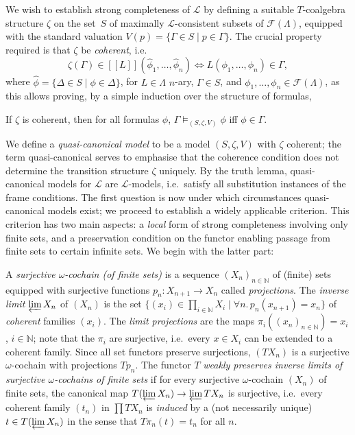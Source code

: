 \documentclass[proceedings]{stacs}
\theoremstyle{definition}
\theoremstyle{plain}
\newcommand{\Sem}[1]{{[\![#1]\!]}}
\newcommand{\Lang}{\mathcal{L}}
\newcommand{\FLang}{\mathcal{F}}
\newcommand{\Nat}{{\mathbb{N}}}
\newcommand{\invlim}{\varprojlim}
\begin{document}
\noindent 
We wish to establish strong completeness of $\Lang$ by defining a
suitable $T$-coalgebra structure $\zeta$ on the set~$S$ of maximally
$\Lang$-consistent subsets of $\FLang(\Lambda)$, equipped with the
standard valuation $V(p)=\{\Gamma\in S\mid p\in\Gamma\}$. The crucial
property required is that $\zeta$ be \emph{coherent}, i.e.
\begin{equation*}
  \zeta(\Gamma)\in \Sem{L}(\hat\phi_1,\dots,\hat\phi_n) \iff 
  L(\phi_1,\dots,\phi_n)\in \Gamma,
\end{equation*}
where $\hat\phi=\{\Delta\in S\mid \phi\in\Delta\}$, for $L\in\Lambda$
$n$-ary, $\Gamma\in S$, and $\phi_1,\dots,\phi_n\in\FLang(\Lambda)$,
as this allows proving, by a simple induction over the structure of
formulas,
\begin{lem}
  If $\zeta$ is coherent, then for all formulas $\phi$,
  $\Gamma\models_{(S,\zeta,V)}\phi$ iff $\phi\in\Gamma$.
\end{lem}
\noindent We define a \emph{quasi-canonical model} to be a model
$(S,\zeta,V)$ with $\zeta$ coherent; the term quasi-canonical serves
to emphasise that the coherence condition does not determine the
transition structure $\zeta$ uniquely. By the truth lemma,
quasi-canonical models for $\Lang$ are $\Lang$-models, i.e.\ satisfy
all substitution instances of the frame conditions. The first question
is now under which circumstances quasi-canonical models exist; we
proceed to establish a widely applicable criterion. This criterion has
two main aspects: a \emph{local} form of strong completeness involving
only finite sets, and a preservation condition on the functor enabling
passage from finite sets to certain infinite sets. We begin with the
latter part:
\begin{defi}
  A \emph{surjective $\omega$-cochain (of finite sets)} is a sequence
  $(X_n)_{n\in\Nat}$ of (finite) sets equipped with surjective
  functions $p_n:X_{n+1}\to X_n$ called \emph{projections}. The
  \emph{inverse limit} $\invlim X_n$ of $(X_n)$ is the set
  $\{(x_i)\in\prod_{i\in\Nat} X_i \mid \forall n.\,p_n(x_{n+1})=x_n\}$ of
  \emph{coherent} families $(x_i)$. The \emph{limit projections} are
  the maps $\pi_i((x_n)_{n\in\Nat})=x_i$, $i\in\Nat$; note that the
  $\pi_i$ are surjective, i.e.\ every $x\in X_i$ can be extended to a
  coherent family. Since all set functors preserve surjections,
  $(TX_n)$ is a surjective $\omega$-cochain with projections
  $Tp_n$. The functor $T$ \emph{weakly preserves inverse limits of
    surjective $\omega$-cochains of finite sets} if for every
  surjective $\omega$-cochain $(X_n)$ of finite sets, the canonical
  map $T(\invlim X_n)\to\invlim TX_n$ is surjective, i.e.\ every
  coherent family $(t_n)$ in $\prod TX_n$ is \emph{induced} by a (not
  necessarily unique) $t\in T(\invlim X_n)$ in the sense that
  $T\pi_n(t)=t_n$ for all $n$.
\end{defi}
\end{document}
